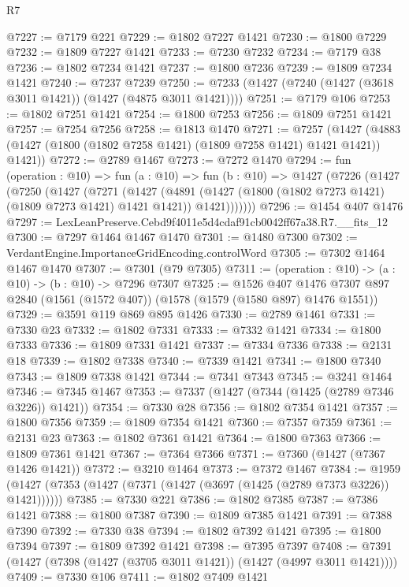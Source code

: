 \begin{lexlean}{R7}
\begin{coremodule}
@7227 := @7179 @221
@7229 := @1802 @7227 @1421
@7230 := @1800 @7229
@7232 := @1809 @7227 @1421
@7233 := @7230 @7232
@7234 := @7179 @38
@7236 := @1802 @7234 @1421
@7237 := @1800 @7236
@7239 := @1809 @7234 @1421
@7240 := @7237 @7239
@7250 := @7233 (@1427 (@7240 (@1427 (@3618 @3011 @1421)) (@1427 (@4875 @3011 @1421))))
@7251 := @7179 @106
@7253 := @1802 @7251 @1421
@7254 := @1800 @7253
@7256 := @1809 @7251 @1421
@7257 := @7254 @7256
@7258 := @1813 @1470
@7271 := @7257
    (@1427 (@4883 (@1427 (@1800 (@1802 @7258 @1421) (@1809 @7258 @1421) @1421 @1421)) @1421))
@7272 := @2789 @1467
@7273 := @7272 @1470
@7294 := fun (operation : @10) =>
  fun (a : @10) =>
  fun (b : @10) =>
  @1427
    (@7226
      (@1427
        (@7250
          (@1427
            (@7271
              (@1427
                (@4891
                  (@1427 (@1800 (@1802 @7273 @1421) (@1809 @7273 @1421) @1421 @1421))
                  @1421)))))))
@7296 := @1454 @407 @1476
@7297 := LexLeanPreserve.Cebd9f4011e5d4cdaf91cb0042ff67a38.R7.__fits_12
@7300 := @7297 @1464 @1467 @1470
@7301 := @1480 @7300
@7302 := VerdantEngine.ImportanceGridEncoding.controlWord
@7305 := @7302 @1464 @1467 @1470
@7307 := @7301 (@79 @7305)
@7311 := (operation : @10) -> (a : @10) -> (b : @10) -> @7296 @7307
@7325 := @1526
    @407
    @1476
    @7307
    @897
    @2840
    (@1561 (@1572 @407))
    (@1578 (@1579 (@1580 @897) @1476 @1551))
@7329 := @3591 @119 @869 @895 @1426
@7330 := @2789 @1461
@7331 := @7330 @23
@7332 := @1802 @7331
@7333 := @7332 @1421
@7334 := @1800 @7333
@7336 := @1809 @7331 @1421
@7337 := @7334 @7336
@7338 := @2131 @18
@7339 := @1802 @7338
@7340 := @7339 @1421
@7341 := @1800 @7340
@7343 := @1809 @7338 @1421
@7344 := @7341 @7343
@7345 := @3241 @1464
@7346 := @7345 @1467
@7353 := @7337 (@1427 (@7344 (@1425 (@2789 @7346 @3226)) @1421))
@7354 := @7330 @28
@7356 := @1802 @7354 @1421
@7357 := @1800 @7356
@7359 := @1809 @7354 @1421
@7360 := @7357 @7359
@7361 := @2131 @23
@7363 := @1802 @7361 @1421
@7364 := @1800 @7363
@7366 := @1809 @7361 @1421
@7367 := @7364 @7366
@7371 := @7360 (@1427 (@7367 @1426 @1421))
@7372 := @3210 @1464
@7373 := @7372 @1467
@7384 := @1959 (@1427 (@7353 (@1427 (@7371 (@1427 (@3697 (@1425 (@2789 @7373 @3226)) @1421))))))
@7385 := @7330 @221
@7386 := @1802 @7385
@7387 := @7386 @1421
@7388 := @1800 @7387
@7390 := @1809 @7385 @1421
@7391 := @7388 @7390
@7392 := @7330 @38
@7394 := @1802 @7392 @1421
@7395 := @1800 @7394
@7397 := @1809 @7392 @1421
@7398 := @7395 @7397
@7408 := @7391 (@1427 (@7398 (@1427 (@3705 @3011 @1421)) (@1427 (@4997 @3011 @1421))))
@7409 := @7330 @106
@7411 := @1802 @7409 @1421

\end{coremodule}
\end{lexlean}
